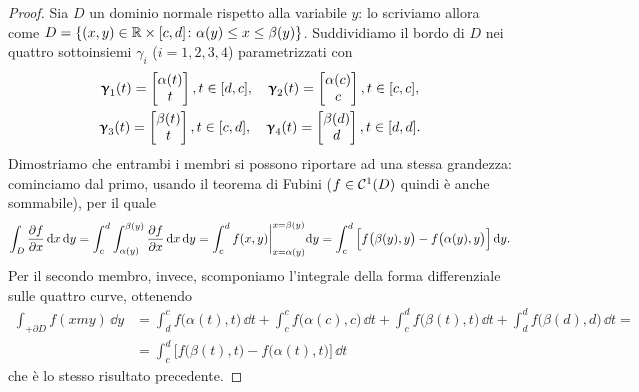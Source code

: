 \begin{proof}
	Sia $D$ un dominio normale rispetto alla variabile $y$: lo scriviamo allora come $D=\{(x,y)\in\mathbb{R}\times[c,d]\colon \alpha(y)\leq x\leq\beta(y)\}$.
	Suddividiamo il bordo di $D$ nei quattro sottoinsiemi $\gamma_i$ ($i=1,2,3,4$) parametrizzati con
	\begin{gather*}
		\bm{\upgamma}_1(t)=
		\begin{bmatrix}
			\alpha(t)\\t
		\end{bmatrix}, t\in[d,c],\quad
		\bm{\upgamma}_2(t)=
		\begin{bmatrix}
			\alpha(c)\\c
		\end{bmatrix}, t\in[c,c],\\
		\bm{\upgamma}_3(t)=
		\begin{bmatrix}
			\beta(t)\\t
		\end{bmatrix}, t\in[c,d],\quad 
		\bm{\upgamma}_4(t)=
		\begin{bmatrix}
			\beta(d)\\d
		\end{bmatrix}, t\in[d,d].
	\end{gather*}
	Dimostriamo che entrambi i membri si possono riportare ad una stessa grandezza: cominciamo dal primo, usando il teorema di Fubini ($f\in\mathcal{C}^{{1}}(D)$ quindi è anche sommabile), per il quale
	\begin{equation}
		\int_D\frac{\partial {f}}{\partial {x}}\,\textup{d} x\,\textup{d} y=\int_c^d\int_{\alpha(y)}^{\beta(y)}\frac{\partial {f}}{\partial {x}}\,\textup{d} x\,\textup{d} y=\int_c^df(x,y)\bigg|_{x=\alpha(y)}^{x=\beta(y)}\textup{d} y=\int_c^d\Big[f\big(\beta(y),y\big)-f\big(\alpha(y),y\big)\Big]\,\textup{d} y.
	\end{equation}
	Per il secondo membro, invece, scomponiamo l'integrale della forma differenziale sulle quattro curve, ottenendo
	\begin{equation}
		\begin{split}
			\int_{+\partial D}f(xmy)\,\dd y&=\int_d^cf\big(\alpha(t),t\big)\,\dd t+\int_c^cf\big(\alpha(c),c\big)\,\dd t+\int_c^df\big(\beta(t),t\big)\,\dd t+\int_d^df\big(\beta(d),d\big)\,\dd t=\\
			&=\int_c^d\Big[f\big(\beta(t),t\big)-f\big(\alpha(t),t\big)\Big]\,\dd t
		\end{split}
	\end{equation}
	che è lo stesso risultato precedente.


\end{proof}
